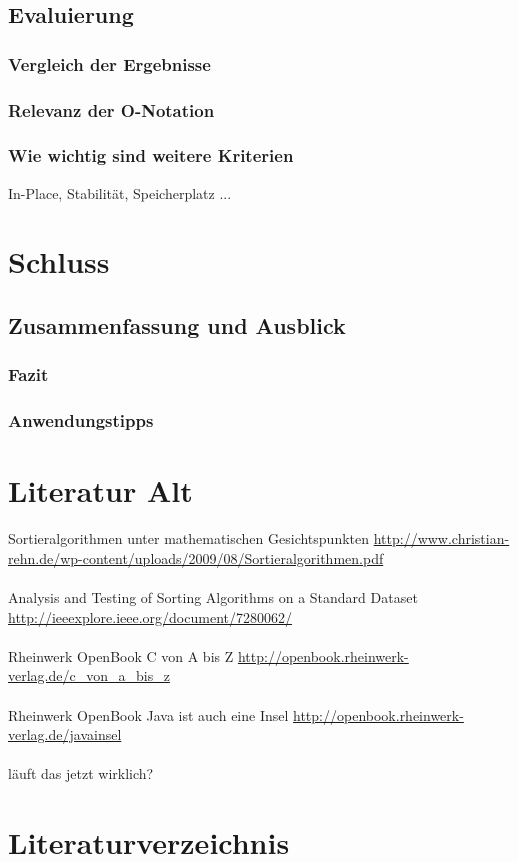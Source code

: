 \documentclass{article}
\begin{document}
\subsection{Evaluierung}
\subsubsection{Vergleich der Ergebnisse}
\subsubsection{Relevanz der O-Notation}
\subsubsection{Wie wichtig sind weitere Kriterien}
In-Place, Stabilität, Speicherplatz ...

\section{Schluss}
\subsection{Zusammenfassung und Ausblick}
\subsubsection{Fazit}
\subsubsection{Anwendungstipps}



\section{Literatur Alt}
Sortieralgorithmen unter mathematischen Gesichtspunkten  \url {http://www.christian-rehn.de/wp-content/uploads/2009/08/Sortieralgorithmen.pdf} \\ \\
Analysis and Testing of Sorting Algorithms on a Standard Dataset \url {http://ieeexplore.ieee.org/document/7280062/}\\ \\
Rheinwerk OpenBook C von A bis Z \url {http://openbook.rheinwerk-verlag.de/c_von_a_bis_z} \\ \\
Rheinwerk OpenBook Java ist auch eine Insel \url {http://openbook.rheinwerk-verlag.de/javainsel} \\ \\

läuft das jetzt \cite{Rehn2006Sortieralgorithmen} wirklich?
\section{Literaturverzeichnis}

%



\end{document}

